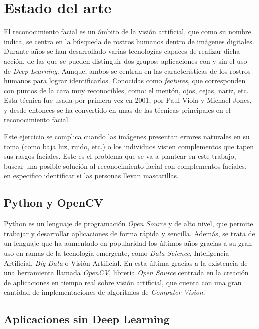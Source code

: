 
\chapter{Estado del arte}

El reconocimiento facial es un ámbito de la visión artificial, que como su nombre indica, se centra en la búsqueda de rostros humanos dentro de imágenes digitales. Durante años se han desarrollado varias tecnologías capaces de realizar dicha acción, de las que se pueden distinguir dos grupos: aplicaciones con y sin el uso de \textit{Deep Learning}. Aunque, ambos se centran en las características de los rostros humanos para lograr identificarlos. Conocidas como \textit{features}, que corresponden con puntos de la cara muy reconocibles, como: el mentón, ojos, cejas, nariz, etc. Esta técnica fue usada por primera vez en 2001, por Paul Viola y Michael Jones, y desde entonces se ha convertido en unas de las técnicas principales en el reconocimiento facial.

Este ejercicio se complica cuando las imágenes presentan errores naturales en su toma (como baja luz, ruido, etc.) o los individuos visten complementos que tapen sus rasgos faciales. Este es el problema que se va a plantear en este trabajo, buscar una posible solución al reconocimiento facial con complementos faciales, en especifico identificar si las personas llevan mascarillas.

\section{Python y OpenCV}

Python es un lenguaje de programación \textit{Open Source} y de alto nivel, que permite trabajar y desarrollar aplicaciones de forma rápida y sencilla. Además, se trata de un lenguaje que ha aumentado en popularidad los últimos años gracias a su gran uso en ramas de la tecnología emergente, como \textit{Data Science}, Inteligencia Artificial, \textit{Big Data} o Visión Artificial. En esta última gracias a la existencia de una herramienta llamada \textit{OpenCV}, librería \textit{Open Source} centrada en la creación de aplicaciones en tiempo real sobre visión artificial, que cuenta con una gran cantidad de implementaciones de algoritmos de \textit{Computer Vision}.

\section{Aplicaciones sin Deep Learning}

